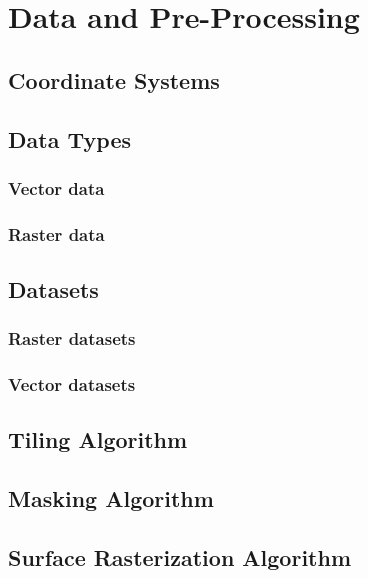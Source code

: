 \chapter{Data and Pre-Processing}%
\label{sec:data}

\section{Coordinate Systems}

\section{Data Types}
\subsection{Vector data}
\subsection{Raster data}

\section{Datasets}
\subsection{Raster datasets}
\subsection{Vector datasets}

\section{Tiling Algorithm}

\section{Masking Algorithm}

\newpage
\section{Surface Rasterization Algorithm}%
\label{sec:surface-rasterization}

